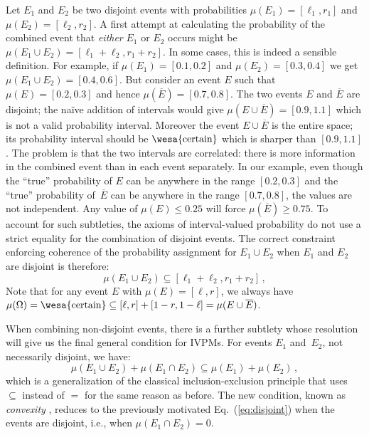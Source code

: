 \documentclass[english,reprint, aps, prl,superscriptaddress, showpacs,
showkeys, longbibliography, amsmath, amssymb, floatfix]{revtex4-1}
\theoremstyle{plain}
\theoremstyle{definition}
\newcommand{\necess}{{\text{\wesa{certain}}}}
\begin{document}
Let $E_1$ and $E_2$ be two disjoint events with probabilities
$\mu(E_1)=[\ell_1,r_1]$ and $\mu(E_2)=[\ell_2,r_2]$. A first attempt
at calculating the probability of the combined event that
\emph{either} $E_1$ or $E_2$ occurs might be
$\mu(E_1\cup E_2) = [\ell_1+\ell_2,r_1+r_2]$. In some cases, this is
indeed a sensible definition. For example, if $\mu(E_1)=[0.1,0.2]$ and
$\mu(E_2)=[0.3,0.4]$ we get $\mu(E_1\cup E_2) = [0.4,0.6]$. But
consider an event $E$ such that $\mu(E)=[0.2,0.3]$ and hence
$\mu(\overline{E})=[0.7,0.8]$. The two events $E$ and $\overline{E}$
are disjoint; the naïve addition of intervals would give
$\mu(E\cup\overline{E})=[0.9,1.1]$ which is not a valid probability
interval. Moreover the event $E\cup\overline{E}$ is the
entire space; its probability interval should be
$\necess$ which is sharper than $[0.9,1.1]$. The problem is that the
two intervals are correlated: there is more information in the
combined event than in each event separately. In our example, even
though the ``true'' probability of $E$ can be anywhere in the range
$[0.2,0.3]$ and the ``true'' probability of~$\overline{E}$ can be
anywhere in the range $[0.7,0.8]$, the values are not independent. Any
value of $\mu(E) \leq 0.25$ will force $\mu(\overline{E})\geq
0.75$. To account for such subtleties, the axioms of interval-valued
probability do not use a strict equality for the combination of
disjoint events. The correct constraint enforcing coherence of
the probability assignment for
$E_1\cup E_2$ when $E_1$ and $E_2$ are disjoint is therefore:
\begin{equation}
\label{eq:disjoint}
\mu(E_1\cup E_2) \subseteq [\ell_1+\ell_2,r_1+r_2]\,,
\end{equation}
Note that for any event $E$ with $\mu(E)=[\ell,r]$, we always have
$\mu(\Omega)=\necess\subseteq[\ell,r]+[1-r,1-\ell]=\mu(E\cup\overline{E})$.

When combining non-disjoint events, there is a further subtlety whose
resolution will give us the final general condition for IVPMs. For
events $E_1$ and~$E_2$, not necessarily disjoint, we have:
\begin{equation}
\mu(E_1\cup E_2) + \mu(E_1\cap E_2) \subseteq \mu(E_1) + \mu(E_2)\,,
\label{eq:classicalconvex}
\end{equation}
which is a generalization of the classical inclusion-exclusion
principle that uses $\subseteq$ instead of $=$ for the same reason as
before. The new condition, known as \emph{convexity}
\cite{Shapley1971,GilboaSchmeidler1994,NgMoYeh1997,Marinacci1999,MarinacciMontrucchio2005,Grabisch2016},
reduces to the previously motivated Eq.~(\ref{eq:disjoint}) when the
events are disjoint, i.e., when $\mu(E_1\cap E_2) = 0$.
\end{document}
